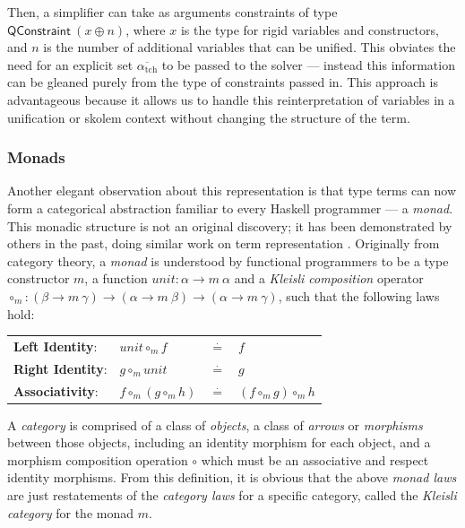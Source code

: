 \documentclass[a4paper]{jfp}
\begin{document}
Then, a simplifier can take as arguments constraints of type $\textsf{QConstraint}\ (x \oplus n)$, where $x$ is the type for rigid
variables and constructors, and $n$ is the number of additional variables that can be unified. This obviates the need for an explicit set
$\overline{\alpha_\text{tch}}$ to be passed to the solver --- instead this information can be gleaned purely from the type of constraints passed in.
This approach is advantageous because it allows us to handle this reinterpretation of variables in a unification or skolem context without changing
the structure of the term. 

\subsubsection{Monads}

Another elegant observation about this representation is that type terms can now form a categorical abstraction familiar to every Haskell programmer --- a
\emph{monad}. This monadic structure is not an original discovery; it has been demonstrated by others in the past, doing similar work on term
representation \cite{Bird:1999:DBN:968699.968702, Bellegarde:1994:SFM:202774.202788}.  Originally from category theory, a \emph{monad} is understood
by functional programmers to be a type constructor $m$, a function $unit : \alpha \rightarrow m\ \alpha$ and a \emph{Kleisli composition} operator
$\circ_m : (\beta \rightarrow m\ \gamma) \rightarrow (\alpha \rightarrow m\ \beta) \rightarrow (\alpha \rightarrow m\ \gamma)$, such that the
following laws hold:

\begin{tabular}{llll}
      \textbf{Left Identity}: & $unit \circ_m f $&$\stackrel{\cdot}{=}$&$ f$\\
      \textbf{Right Identity}:& $g \circ_m unit $&$\stackrel{\cdot}{=}$&$ g$\\
      \textbf{Associativity}: & $f \circ_m (g \circ_m h) $&$\stackrel{\cdot}{=}$&$ (f \circ_m g) \circ_m h$\\
\end{tabular}

A \emph{category} is comprised of a class of \emph{objects}, a class of \emph{arrows} or \emph{morphisms} between those objects, including an
identity morphism for each object,  and a morphism composition operation $\circ$ which must be an associative and respect identity
morphisms. From this definition, it is obvious that the above \emph{monad laws} are just restatements of the \emph{category laws} for a specific
category, called the \emph{Kleisli category} for the monad $m$. 
\end{document}
